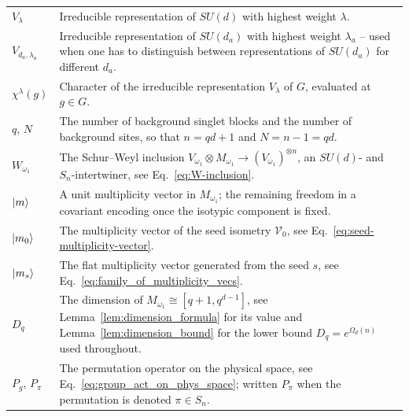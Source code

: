 \documentclass[11pt,letterpaper]{article}
\theoremstyle{plain}
\theoremstyle{plain}
\theoremstyle{plain}
\theoremstyle{plain}
\theoremstyle{plain}
\theoremstyle{plain}
\theoremstyle{plain}
\theoremstyle{definition}
\theoremstyle{plain}
\begin{document}
\begin{tabular}{@{}ll@{}}
\parbox[t]{0.22\textwidth}{$V_{\lambda}$} & \parbox[t]{0.72\textwidth}{Irreducible representation of $SU(d)$ with highest weight $\lambda$.} \\[0.6em]

\parbox[t]{0.22\textwidth}{$V_{d_{a},\lambda_a}$} & \parbox[t]{0.72\textwidth}{Irreducible representation of $SU(d_a)$ with highest weight $\lambda_a$ -- used when one has to distinguish between representations of $SU(d_a)$ for different $d_a$.} \\[0.6em]

\parbox[t]{0.22\textwidth}{$\chi^{\lambda}(g)$} & \parbox[t]{0.72\textwidth}{Character of the irreducible representation $V_{\lambda}$ of $G$, evaluated at $g \in G$.} \\[0.6em]

\parbox[t]{0.22\textwidth}{$q$, $N$} & \parbox[t]{0.72\textwidth}{The number of background singlet blocks and the number of background sites, so that $n=qd+1$ and $N=n-1=qd$.} \\[0.6em]

\parbox[t]{0.22\textwidth}{$W_{\omega_1}$} & \parbox[t]{0.72\textwidth}{The Schur--Weyl inclusion $V_{\omega_1}\otimes M_{\omega_1}\to(V_{\omega_1})^{\otimes n}$, an $SU(d)$- and $S_n$-intertwiner, see Eq.~\eqref{eq:W-inclusion}.} \\[0.6em]

\parbox[t]{0.22\textwidth}{$\ket m$} & \parbox[t]{0.72\textwidth}{A unit multiplicity vector in $M_{\omega_1}$; the remaining freedom in a covariant encoding once the isotypic component is fixed.} \\[0.6em]

\parbox[t]{0.22\textwidth}{$\ket{m_0}$} & \parbox[t]{0.72\textwidth}{The multiplicity vector of the seed isometry $\mathcal{V}_0$, see Eq.~\eqref{eq:seed-multiplicity-vector}.} \\[0.6em]

\parbox[t]{0.22\textwidth}{$\ket{m_s}$} & \parbox[t]{0.72\textwidth}{The flat multiplicity vector generated from the seed $s$, see Eq.~\eqref{eq:family_of_multiplicity_vecs}.} \\[0.6em]

\parbox[t]{0.22\textwidth}{$D_q$} & \parbox[t]{0.72\textwidth}{The dimension of $M_{\omega_1}\cong[q+1,q^{d-1}]$, see Lemma~\ref{lem:dimension_formula} for its value and Lemma~\ref{lem:dimension_bound} for the lower bound $D_q=e^{\Omega_d(n)}$ used throughout}. \\[0.6em]

\parbox[t]{0.22\textwidth}{$P_g$, $P_\pi$} & \parbox[t]{0.72\textwidth}{The permutation operator on the physical space, see Eq.~\eqref{eq:group_act_on_phys_space}; written $P_\pi$ when the permutation is denoted $\pi\in S_n$.} \\[0.6em]

\end{tabular}
\end{document}

